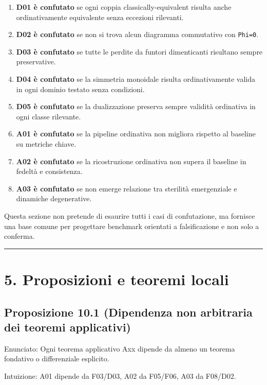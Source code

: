 \begin{enumerate}
\def\labelenumi{\arabic{enumi}.}
\tightlist
\item
  \textbf{D01 è confutato} se ogni coppia classically-equivalent risulta anche ordinativamente equivalente senza eccezioni rilevanti.
\item
  \textbf{D02 è confutato} se non si trova alcun diagramma commutativo con \texttt{Phi=0}.
\item
  \textbf{D03 è confutato} se tutte le perdite da funtori dimenticanti risultano sempre preservative.
\item
  \textbf{D04 è confutato} se la simmetria monoidale risulta ordinativamente valida in ogni dominio testato senza condizioni.
\item
  \textbf{D05 è confutato} se la dualizzazione preserva sempre validità ordinativa in ogni classe rilevante.
\item
  \textbf{A01 è confutato} se la pipeline ordinativa non migliora rispetto al baseline su metriche chiave.
\item
  \textbf{A02 è confutato} se la ricostruzione ordinativa non supera il baseline in fedeltà e consistenza.
\item
  \textbf{A03 è confutato} se non emerge relazione tra sterilità emergenziale e dinamiche degenerative.
\end{enumerate}

Questa sezione non pretende di esaurire tutti i casi di confutazione, ma fornisce una base comune per progettare benchmark orientati a falsificazione e non solo a conferma.

\begin{center}\rule{0.5\linewidth}{0.5pt}\end{center}

\section{5. Proposizioni e teoremi locali}

\subsection{Proposizione 10.1 (Dipendenza non arbitraria dei teoremi applicativi)}

Enunciato:
Ogni teorema applicativo Axx dipende da almeno un teorema fondativo o differenziale esplicito.

Intuizione:
A01 dipende da F03/D03, A02 da F05/F06, A03 da F08/D02.

